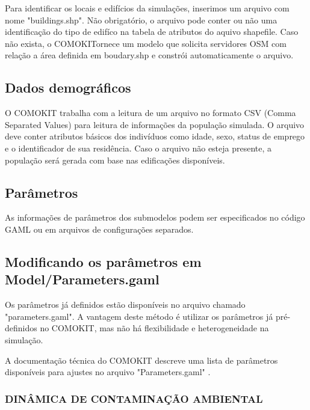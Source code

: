 Para identificar os locais e edifícios da simulações, inserimos um arquivo com nome "buildings.shp". Não obrigatório, o arquivo pode conter ou não uma identificação do tipo de edifíco na tabela de atributos do aquivo shapefile. Caso não exista, o COMOKITornece um modelo que solicita servidores OSM com relação
a área definida em boudary.shp e constrói automaticamente o arquivo.

\subsection{Dados demográficos}

O COMOKIT trabalha com a leitura de um arquivo no formato CSV (Comma Separated Values) para leitura de informações da população simulada. O arquivo deve conter atributos básicos dos indivíduos como idade, sexo, status de emprego e o identificador de sua residência. Caso o arquivo não esteja presente, a população será gerada com base nas edificações disponíveis.


\subsection{Parâmetros}

As informações de parâmetros dos submodelos podem ser especificados no código
GAML ou em arquivos de configurações separados.

\subsection{Modificando os parâmetros em Model/Parameters.gaml}

Os parâmetros já definidos estão disponíveis no arquivo chamado "parameters.gaml". A vantagem deste método é utilizar os parâmetros já pré-definidos no COMOKIT, mas não há flexibilidade e heterogeneidade na simulação.

A documentação técnica do COMOKIT descreve uma lista de parâmetros disponíveis para ajustes no arquivo "Parameters.gaml" \cite{ParametrosCOMOKIT:online}.

\subsubsection{DINÂMICA DE CONTAMINAÇÃO AMBIENTAL}

